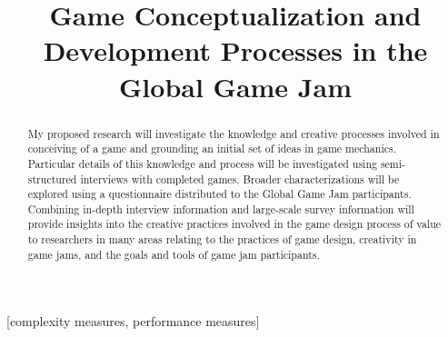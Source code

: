 \documentclass{sig-alternate}
\begin{document}

\title{Game Conceptualization and Development Processes in the Global Game Jam}

\author{}

\maketitle
\begin{abstract}
My proposed research will investigate the knowledge and creative processes involved in conceiving of a game and grounding an initial set of ideas in game mechanics. Particular details of this knowledge and process will be investigated using semi-structured interviews with completed games. Broader characterizations will be explored using a questionnaire distributed to the Global Game Jam participants. Combining in-depth interview information and large-scale survey information will provide insights into the creative practices involved in the game design process of value to researchers in many areas relating to the practices of game design, creativity in game jams, and the goals and tools of game jam participants.
\end{abstract}

[complexity measures, performance measures]
\end{document}
